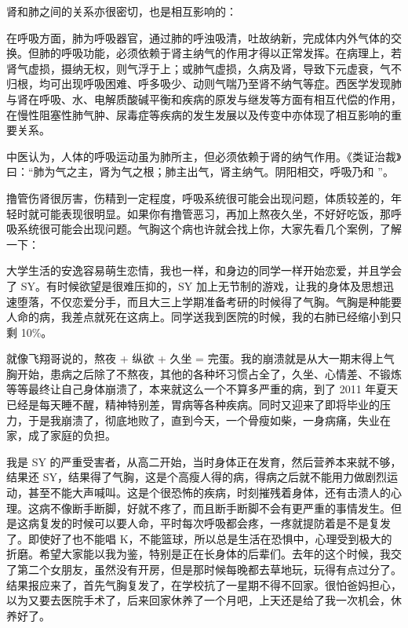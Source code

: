 肾和肺之间的关系亦很密切，也是相互影响的：

在呼吸方面，肺为呼吸器官，通过肺的呼浊吸清，吐故纳新，完成体内外气体的交换。但肺的呼吸功能，必须依赖于肾主纳气的作用才得以正常发挥。在病理上，若肾气虚损，摄纳无权，则气浮于上；或肺气虚损，久病及肾，导致下元虚衰，气不归根，均可出现呼吸困难、呼多吸少、动则气喘乃至肾不纳气等症。西医学发现肺与肾在呼吸、水、电解质酸碱平衡和疾病的原发与继发等方面有相互代偿的作用，在慢性阻塞性肺气肿、尿毒症等疾病的发生发展以及传变中亦体现了相互影响的重要关系。

中医认为，人体的呼吸运动虽为肺所主，但必须依赖于肾的纳气作用。《类证治裁》曰：“肺为气之主，肾为气之根；肺主出气，肾主纳气。阴阳相交，呼吸乃和 ”。

撸管伤肾很厉害，伤精到一定程度，呼吸系统很可能会出现问题，体质较差的，年轻时就可能表现很明显。如果你有撸管恶习，再加上熬夜久坐，不好好吃饭，那呼吸系统很可能会出现问题。气胸这个病也许就会找上你，大家先看几个案例，了解一下：

\begin{case}[气胸]
    大学生活的安逸容易萌生恋情，我也一样，和身边的同学一样开始恋爱，并且学会了 SY。有时候欲望是很难压抑的，SY 加上无节制的游戏，让我的身体及思想迅速堕落，不仅恋爱分手，而且大三上学期准备考研的时候得了气胸。气胸是种能要人命的病，我差点就死在这病上。同学送我到医院的时候，我的右肺已经缩小到只剩 10\%。
\end{case}

\begin{case}[气胸]
    就像飞翔哥说的，熬夜 + 纵欲 + 久坐 = 完蛋。我的崩溃就是从大一期末得上气胸开始，患病之后除了不熬夜，其他的各种坏习惯占全了，久坐、心情差、不锻炼等等最终让自己身体崩溃了，本来就这么一个不算多严重的病，到了 2011 年夏天已经是每天睡不醒，精神特别差，胃病等各种疾病。同时又迎来了即将毕业的压力，于是我崩溃了，彻底地败了，直到今天，一个骨瘦如柴，一身病痛，失业在家，成了家庭的负担。
\end{case}

\begin{case}[气胸]
    我是 SY 的严重受害者，从高二开始，当时身体正在发育，然后营养本来就不够，结果还 SY，结果得了气胸，这是个高瘦人得的病，得病之后就不能用力做剧烈运动，甚至不能大声喊叫。这是个很恐怖的疾病，时刻摧残着身体，还有击溃人的心理。这病不像断手断脚，好就不疼了，而且断手断脚不会有更严重的事情发生。但是这病复发的时候可以要人命，平时每次呼吸都会疼，一疼就提防着是不是复发了。即使好了也不能唱 K，不能篮球，所以总是生活在恐惧中，心理受到极大的折磨。希望大家能以我为鉴，特别是正在长身体的后辈们。去年的这个时候，我交了第二个女朋友，虽然没有开房，但是那时候每晚都去草地玩，玩得有点过分了。结果报应来了，首先气胸复发了，在学校抗了一星期不得不回家。很怕爸妈担心，以为又要去医院手术了，后来回家休养了一个月吧，上天还是给了我一次机会，休养好了。
\end{case}

